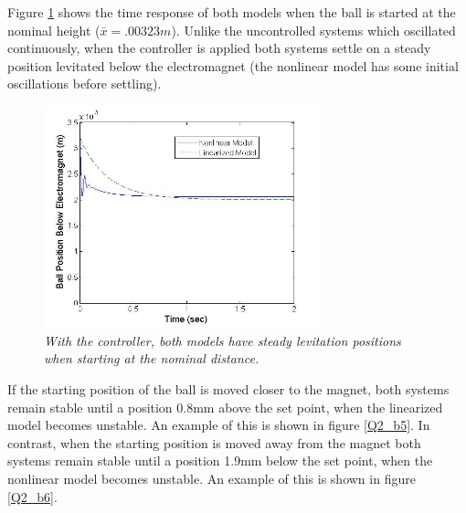 \documentclass{article}
\theoremstyle{plain}
\theoremstyle{definition}
\theoremstyle{remark}
\begin{document}
Figure \ref{Q2_b4} shows the time response of both models when the ball is started at the nominal height ($\bar{x} = .00323m$). Unlike the uncontrolled systems which oscillated continuously, when the controller is applied both systems settle on a steady position levitated below the electromagnet (the nonlinear model has some initial oscillations before settling).\\

\begin{figure}[htb]
\begin{center}
\includegraphics[width = 8cm]{Part2bNoDisturbance.jpg}
\caption{\emph{With the controller, both models have steady levitation positions when starting at the nominal distance.}}
\label{Q2_b4}
\end{center}
\end{figure}

If the starting position of the ball is moved closer to the magnet, both systems remain stable until a position 0.8mm above the set point, when the linearized model becomes unstable. An example of this is shown in figure \ref{Q2_b5}. In contrast, when the starting position is moved away from the magnet both systems remain stable until a position 1.9mm below the set point, when the nonlinear model becomes unstable. An example of this is shown in figure \ref{Q2_b6}.\\
\end{document}
